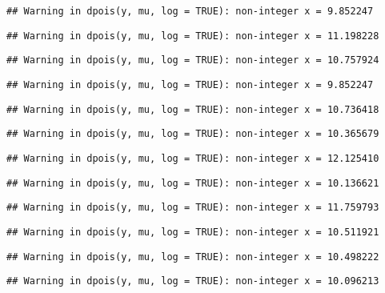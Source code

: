 \documentclass[
]{article}
\begin{document}
\begin{verbatim}
## Warning in dpois(y, mu, log = TRUE): non-integer x = 9.852247
\end{verbatim}

\begin{verbatim}
## Warning in dpois(y, mu, log = TRUE): non-integer x = 11.198228
\end{verbatim}

\begin{verbatim}
## Warning in dpois(y, mu, log = TRUE): non-integer x = 10.757924
\end{verbatim}

\begin{verbatim}
## Warning in dpois(y, mu, log = TRUE): non-integer x = 9.852247
\end{verbatim}

\begin{verbatim}
## Warning in dpois(y, mu, log = TRUE): non-integer x = 10.736418
\end{verbatim}

\begin{verbatim}
## Warning in dpois(y, mu, log = TRUE): non-integer x = 10.365679
\end{verbatim}

\begin{verbatim}
## Warning in dpois(y, mu, log = TRUE): non-integer x = 12.125410
\end{verbatim}

\begin{verbatim}
## Warning in dpois(y, mu, log = TRUE): non-integer x = 10.136621
\end{verbatim}

\begin{verbatim}
## Warning in dpois(y, mu, log = TRUE): non-integer x = 11.759793
\end{verbatim}

\begin{verbatim}
## Warning in dpois(y, mu, log = TRUE): non-integer x = 10.511921
\end{verbatim}

\begin{verbatim}
## Warning in dpois(y, mu, log = TRUE): non-integer x = 10.498222
\end{verbatim}

\begin{verbatim}
## Warning in dpois(y, mu, log = TRUE): non-integer x = 10.096213
\end{verbatim}
\end{document}
